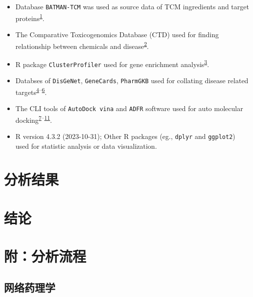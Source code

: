 \documentclass[
]{article}
\providecommand{\tightlist}{%
  \setlength{\itemsep}{0pt}\setlength{\parskip}{0pt}}
\begin{document}
\begin{itemize}
\tightlist
\item
  Database \texttt{BATMAN-TCM} was used as source data of TCM ingredients and target proteins\textsuperscript{\protect\hyperlink{ref-BatmanTcm20Kong2024}{1}}.
\item
  The Comparative Toxicogenomics Database (CTD) used for finding relationship between chemicals and disease\textsuperscript{\protect\hyperlink{ref-ComparativeToxDavis2023}{2}}.
\item
  R package \texttt{ClusterProfiler} used for gene enrichment analysis\textsuperscript{\protect\hyperlink{ref-ClusterprofilerWuTi2021}{3}}.
\item
  Databses of \texttt{DisGeNet}, \texttt{GeneCards}, \texttt{PharmGKB} used for collating disease related targets\textsuperscript{\protect\hyperlink{ref-TheDisgenetKnPinero2019}{4}--\protect\hyperlink{ref-PharmgkbAWorBarbar2018}{6}}.
\item
  The CLI tools of \texttt{AutoDock\ vina} and \texttt{ADFR} software used for auto molecular docking\textsuperscript{\protect\hyperlink{ref-AutodockVina1Eberha2021}{7}--\protect\hyperlink{ref-AutodockfrAdvRavind2015}{11}}.
\item
  R version 4.3.2 (2023-10-31); Other R packages (eg., \texttt{dplyr} and \texttt{ggplot2}) used for statistic analysis or data visualization.
\end{itemize}

\hypertarget{results}{%
\section{分析结果}\label{results}}

\hypertarget{dis}{%
\section{结论}\label{dis}}

\hypertarget{workflow}{%
\section{附：分析流程}\label{workflow}}

\hypertarget{ux7f51ux7edcux836fux7406ux5b66}{%
\subsection{网络药理学}\label{ux7f51ux7edcux836fux7406ux5b66}}
\end{document}
